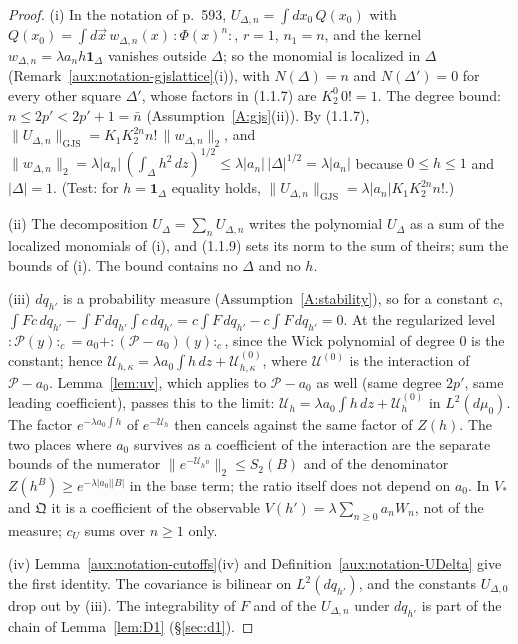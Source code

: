 \documentclass[11pt,a4paper]{article}
\theoremstyle{plain}
\theoremstyle{definition}
\theoremstyle{plain}
\theoremstyle{definition}
\newcommand{\GJS}[1]{\lVert #1\rVert_{\mathrm{GJS}}}   %
\newcommand{\Uc}{\mathcal U}
\newcommand{\dmu}{d\mu_0}
\begin{document}
\begin{proof}
(i) In the notation of p.~593, $U_{\Delta,n}=\int dx_0\,Q(x_0)$ with
$Q(x_0)=\int d\vec x\,w_{\Delta,n}(x)\,{:}\Phi(x)^n{:}$, $r=1$, $n_1=n$, and the kernel
$w_{\Delta,n}=\lambda a_nh\mathbf 1_\Delta$ vanishes outside $\Delta$; so the monomial is
localized in $\Delta$ (Remark~\ref{aux:notation-gjslattice}(i)), with $N(\Delta)=n$ and
$N(\Delta')=0$ for every other square $\Delta'$, whose factors in (1.1.7) are
$K_2^0\,0!=1$.  The degree bound: $n\le2p'<2p'+1=\bar n$ (Assumption~\ref{A:gjs}(ii)).  By (1.1.7),
$\GJS{U_{\Delta,n}}=K_1K_2^{2n}n!\,\|w_{\Delta,n}\|_2$, and
$\|w_{\Delta,n}\|_2=\lambda|a_n|\,(\int_\Delta h^2\,dz)^{1/2}\le\lambda|a_n|\,|\Delta|^{1/2}=
\lambda|a_n|$ because $0\le h\le1$ and $|\Delta|=1$.  (Test: for $h=\mathbf 1_\Delta$ equality
holds, $\GJS{U_{\Delta,n}}=\lambda|a_n|K_1K_2^{2n}n!$.)

(ii) The decomposition $U_\Delta=\sum_nU_{\Delta,n}$ writes the polynomial $U_\Delta$ as a sum
of the localized monomials of (i), and (1.1.9) sets its norm to the sum of theirs; sum the
bounds of (i).  The bound contains no $\Delta$ and no $h$.

(iii) $dq_{h'}$ is a probability measure (Assumption~\ref{A:stability}), so for a constant $c$,
$\int Fc\,dq_{h'}-\int F\,dq_{h'}\int c\,dq_{h'}=c\int F\,dq_{h'}-c\int F\,dq_{h'}=0$.  At the
regularized level ${:}\mathscr P(y){:}_c=a_0+{:}(\mathscr P-a_0)(y){:}_c$, since the Wick
polynomial of degree $0$ is the constant; hence $\Uc_{h,\kappa}=\lambda a_0\int h\,dz+
\Uc^{(0)}_{h,\kappa}$, where $\Uc^{(0)}$ is the interaction of $\mathscr P-a_0$.  Lemma~\ref{lem:uv},
which applies to $\mathscr P-a_0$ as well (same degree $2p'$, same leading coefficient),
passes this to the limit: $\Uc_h=\lambda a_0\int h\,dz+\Uc^{(0)}_h$ in $L^2(\dmu)$.  The
factor $e^{-\lambda a_0\int h}$ of $e^{-\Uc_h}$ then cancels against the same factor of
$Z(h)$.  The two places where $a_0$ survives as a coefficient of the interaction are the separate
bounds of the numerator $\|e^{-\Uc_{h^B}}\|_2\le S_2(B)$ and of the denominator
$Z(h^B)\ge e^{-\lambda|a_0||B|}$ in the base term; the ratio itself does not depend on $a_0$.  In
$V_*$ and $\mathfrak Q$ it is a coefficient of the observable $V(h')=\lambda\sum_{n\ge0}a_nW_n$,
not of the measure; $c_U$ sums over $n\ge1$ only.

(iv) Lemma~\ref{aux:notation-cutoffs}(iv) and Definition~\ref{aux:notation-UDelta} give the
first identity.  The covariance is bilinear on $L^2(dq_{h'})$, and the constants
$U_{\Delta,0}$ drop out by (iii).  The integrability of $F$ and of the $U_{\Delta,n}$ under
$dq_{h'}$ is part of the chain of Lemma~\ref{lem:D1} (\S\ref{sec:d1}).
\end{proof}
\end{document}
